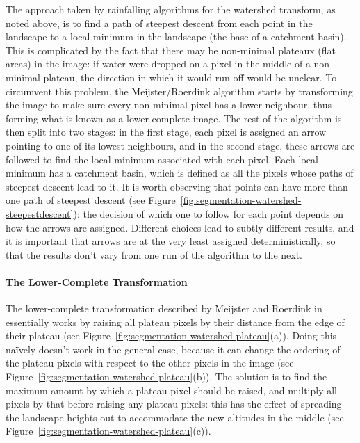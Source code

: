 The approach taken by rainfalling algorithms for the watershed transform, as noted above, is to find a path of steepest descent from each point in the landscape to a local minimum in the landscape (the base of a catchment basin). This is complicated by the fact that there may be non-minimal plateaux (flat areas) in the image: if water were dropped on a pixel in the middle of a non-minimal plateau, the direction in which it would run off would be unclear. To circumvent this problem, the Meijster/Roerdink algorithm starts by transforming the image to make sure every non-minimal pixel has a lower neighbour, thus forming what is known as a lower-complete image. The rest of the algorithm is then split into two stages: in the first stage, each pixel is assigned an arrow pointing to one of its lowest neighbours, and in the second stage, these arrows are followed to find the local minimum associated with each pixel. Each local minimum has a catchment basin, which is defined as all the pixels whose paths of steepest descent lead to it. It is worth observing that points can have more than one path of steepest descent (see Figure~\ref{fig:segmentation-watershed-steepestdescent}): the decision of which one to follow for each point depends on how the arrows are assigned. Different choices lead to subtly different results, and it is important that arrows are at the very least assigned deterministically, so that the results don't vary from one run of the algorithm to the next.


\paragraph{The Lower-Complete Transformation}

The lower-complete transformation described by Meijster and Roerdink in \cite{meijster98} essentially works by raising all plateau pixels by their distance from the edge of their plateau (see Figure~\ref{fig:segmentation-watershed-plateau}(a)). Doing this na\"ively doesn't work in the general case, because it can change the ordering of the plateau pixels with respect to the other pixels in the image (see Figure~\ref{fig:segmentation-watershed-plateau}(b)). The solution is to find the maximum amount by which a plateau pixel should be raised, and multiply all pixels by that before raising any plateau pixels: this has the effect of spreading the landscape heights out to accommodate the new altitudes in the middle (see Figure~\ref{fig:segmentation-watershed-plateau}(c)).

